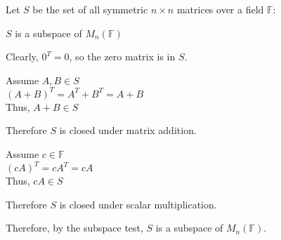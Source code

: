 \documentclass[letterpaper,12pt,fleqn]{article}
\newcommand{\F}{\mathbb{F}}
\newcommand{\Mn}{M_n(\F)}
\begin{document}
\begin{theorem}
  Let $S$ be the set of all symmetric $n\times n$ matrices over a field $\F$:

  $S$ is a subspace of $\Mn$
\end{theorem}

\begin{theproof}
  Clearly, $0^T=0$, so the zero matrix is in $S$.

  Assume $A,B\in S$ \\
  $(A+B)^T=A^T+B^T=A+B$ \\
  Thus, $A+B\in S$

  Therefore $S$ is closed under matrix addition.

  Assume $c\in\F$ \\
  $(cA)^T=cA^T=cA$ \\
  Thus, $cA\in S$

  Therefore $S$ is closed under scalar multiplication.

  Therefore, by the subspace test, $S$ is a subspace of $\Mn$.
\end{theproof}
\end{document}

